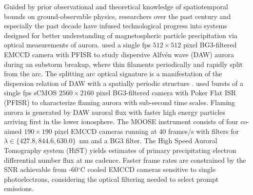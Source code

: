 Guided by prior observational and theoretical knowledge of spatiotemporal bounds on ground-observable physics, researchers over the past century \citep{stormer1930,stormer1932} and especially the past decade \citep{lynch2012,donovan2006,dahlgren2008} have infused technological progress into systems designed for better understanding of magnetospheric particle precipitation via optical measurements of aurora.
\citet{semeter2008} used a single \unit[30]{fps} $512 \times 512$ pixel BG3-filtered EMCCD camera with PFISR to study dispersive Alfvén wave (DAW) aurora during an substorm breakup, where thin filaments periodically and rapidly split from the arc. 
The splitting arc optical signature is a manifestation of the dispersion relation of DAW with a spatially periodic structure \citep{semeter2008}.
\citet{dahlgren2013} used bursts of a single \unit[30]{fps} sCMOS $2560 \times 2160$ pixel BG3-filtered camera with Poker Flat ISR (PFISR) to characterize flaming aurora with sub-second time scales.
Flaming aurora \citep{omholtbook,dahlgren2013} is generated by DAW auroral flux with faster high energy particles arriving first in the lower ionosphere.
The MOOSE instrument \citep{michell2014} consists of four co-aimed $190 \times 190$ pixel EMCCD cameras running at 40 frames/s with filters for $\lambda \in \{427.8, 844.6, 630.0\}$~nm and a BG3 filter.
The High Speed Auroral Tomography system (HiST) \citep{hirsch2016} yields estimates of primary precipitating electron differential number flux at \unit[20]{ms} cadence.
Faster frame rates are constrained by the SNR achievable from -60$^\circ$C cooled EMCCD cameras sensitive to single photoelectrons, considering the optical filtering needed to select prompt emissions.

